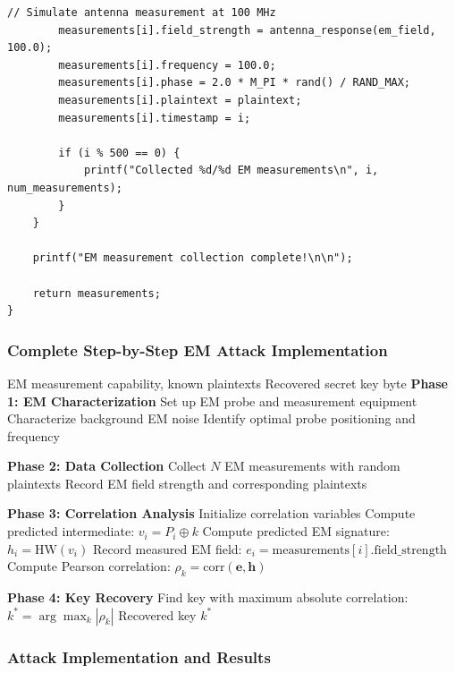 \documentclass[11pt,a4paper]{article}
\theoremstyle{definition}
\begin{document}
\begin{lstlisting}[caption={EM Measurement Infrastructure}]
        // Simulate antenna measurement at 100 MHz
        measurements[i].field_strength = antenna_response(em_field, 100.0);
        measurements[i].frequency = 100.0;
        measurements[i].phase = 2.0 * M_PI * rand() / RAND_MAX;
        measurements[i].plaintext = plaintext;
        measurements[i].timestamp = i;
        
        if (i % 500 == 0) {
            printf("Collected %d/%d EM measurements\n", i, num_measurements);
        }
    }
    
    printf("EM measurement collection complete!\n\n");
    
    return measurements;
}
\end{lstlisting}

\subsubsection{Complete Step-by-Step EM Attack Implementation}

\begin{algorithm}
\caption{Simple EM Analysis Attack}
\begin{algorithmic}[1]
\REQUIRE EM measurement capability, known plaintexts
\ENSURE Recovered secret key byte
\STATE \textbf{Phase 1: EM Characterization}
\STATE Set up EM probe and measurement equipment
\STATE Characterize background EM noise
\STATE Identify optimal probe positioning and frequency

\STATE \textbf{Phase 2: Data Collection}
\STATE Collect $N$ EM measurements with random plaintexts
\STATE Record EM field strength and corresponding plaintexts

\STATE \textbf{Phase 3: Correlation Analysis}
    \STATE Initialize correlation variables
        \STATE Compute predicted intermediate: $v_i = P_i \oplus k$
        \STATE Compute predicted EM signature: $h_i = \text{HW}(v_i)$
        \STATE Record measured EM field: $e_i = \text{measurements}[i].\text{field\_strength}$
    \ENDFOR
    \STATE Compute Pearson correlation: $\rho_k = \text{corr}(\mathbf{e}, \mathbf{h})$
\ENDFOR

\STATE \textbf{Phase 4: Key Recovery}
\STATE Find key with maximum absolute correlation: $k^* = \arg\max_k |\rho_k|$
\RETURN Recovered key $k^*$
\end{algorithmic}
\end{algorithm}

\subsubsection{Attack Implementation and Results}
\end{document}
